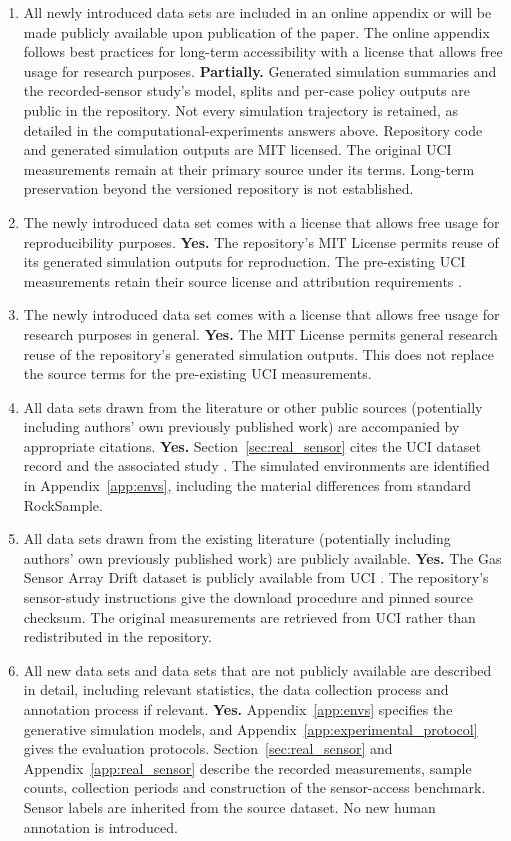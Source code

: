 \documentclass[manuscript, screen, review]{jair}
\begin{document}
\begin{enumerate}
\item All newly introduced data sets are included in an online appendix or will be made publicly available upon publication of the paper. The online appendix follows best practices for long-term accessibility with a license that allows free usage for research purposes. \textbf{Partially.} Generated simulation summaries and the recorded-sensor study's model, splits and per-case policy outputs are public in the repository. Not every simulation trajectory is retained, as detailed in the computational-experiments answers above. Repository code and generated simulation outputs are MIT licensed. The original UCI measurements remain at their primary source under its terms. Long-term preservation beyond the versioned repository is not established.
\item The newly introduced data set comes with a license that allows free usage for reproducibility purposes. \textbf{Yes.} The repository's MIT License permits reuse of its generated simulation outputs for reproduction. The pre-existing UCI measurements retain their source license and attribution requirements \citep{vergara2012data}.
\item The newly introduced data set comes with a license that allows free usage for research purposes in general. \textbf{Yes.} The MIT License permits general research reuse of the repository's generated simulation outputs. This does not replace the source terms for the pre-existing UCI measurements.
\item All data sets drawn from the literature or other public sources (potentially including authors' own previously published work) are accompanied by appropriate citations. \textbf{Yes.} Section~\ref{sec:real_sensor} cites the UCI dataset record and the associated study \citep{vergara2012data,vergara2012}. The simulated environments are identified in Appendix~\ref{app:envs}, including the material differences from standard RockSample.
\item All data sets drawn from the existing literature (potentially including authors’ own previously published work) are publicly available. \textbf{Yes.} The Gas Sensor Array Drift dataset is publicly available from UCI \citep{vergara2012data}. The repository's sensor-study instructions give the download procedure and pinned source checksum. The original measurements are retrieved from UCI rather than redistributed in the repository.
\item All new data sets and data sets that are not publicly available are described in detail, including relevant statistics, the data collection process and annotation process if relevant. \textbf{Yes.} Appendix~\ref{app:envs} specifies the generative simulation models, and Appendix~\ref{app:experimental_protocol} gives the evaluation protocols. Section~\ref{sec:real_sensor} and Appendix~\ref{app:real_sensor} describe the recorded measurements, sample counts, collection periods and construction of the sensor-access benchmark. Sensor labels are inherited from the source dataset. No new human annotation is introduced.

\end{enumerate}
\end{document}
